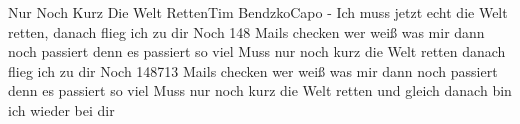 \begin{song}{Nur Noch Kurz Die Welt Retten}{Tim Bendzko}{Capo -}
Ich muss jetzt echt die Welt retten, danach flieg ich zu dir
Noch 148 Mails checken wer weiß was mir dann noch passiert
denn es passiert so viel
Muss nur noch kurz die Welt retten danach flieg ich zu dir
Noch 148713 Mails checken wer weiß was mir dann noch passiert
denn es passiert so viel 
Muss nur noch kurz die Welt retten
und gleich danach bin ich wieder bei dir
\end{song}

